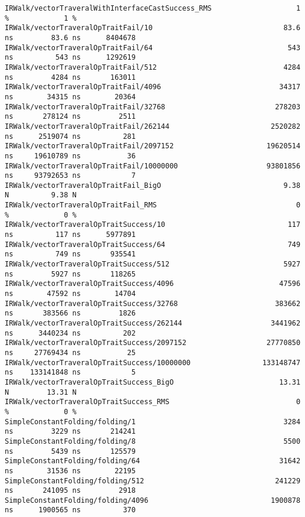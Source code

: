 \begin{code}
\begin{verbatim}
IRWalk/vectorTraveralWithInterfaceCastSuccess_RMS                    1 %             1 %
IRWalk/vectorTraveralOpTraitFail/10                               83.6 ns         83.6 ns      8404678
IRWalk/vectorTraveralOpTraitFail/64                                543 ns          543 ns      1292619
IRWalk/vectorTraveralOpTraitFail/512                              4284 ns         4284 ns       163011
IRWalk/vectorTraveralOpTraitFail/4096                            34317 ns        34315 ns        20364
IRWalk/vectorTraveralOpTraitFail/32768                          278203 ns       278124 ns         2511
IRWalk/vectorTraveralOpTraitFail/262144                        2520282 ns      2519074 ns          281
IRWalk/vectorTraveralOpTraitFail/2097152                      19620514 ns     19610789 ns           36
IRWalk/vectorTraveralOpTraitFail/10000000                     93801856 ns     93792653 ns            7
IRWalk/vectorTraveralOpTraitFail_BigO                             9.38 N          9.38 N
IRWalk/vectorTraveralOpTraitFail_RMS                                 0 %             0 %
IRWalk/vectorTraveralOpTraitSuccess/10                             117 ns          117 ns      5977891
IRWalk/vectorTraveralOpTraitSuccess/64                             749 ns          749 ns       935541
IRWalk/vectorTraveralOpTraitSuccess/512                           5927 ns         5927 ns       118265
IRWalk/vectorTraveralOpTraitSuccess/4096                         47596 ns        47592 ns        14704
IRWalk/vectorTraveralOpTraitSuccess/32768                       383662 ns       383566 ns         1826
IRWalk/vectorTraveralOpTraitSuccess/262144                     3441962 ns      3440234 ns          202
IRWalk/vectorTraveralOpTraitSuccess/2097152                   27770850 ns     27769434 ns           25
IRWalk/vectorTraveralOpTraitSuccess/10000000                 133148747 ns    133141848 ns            5
IRWalk/vectorTraveralOpTraitSuccess_BigO                         13.31 N         13.31 N
IRWalk/vectorTraveralOpTraitSuccess_RMS                              0 %             0 %
SimpleConstantFolding/folding/1                                   3284 ns         3229 ns       214241
SimpleConstantFolding/folding/8                                   5500 ns         5439 ns       125579
SimpleConstantFolding/folding/64                                 31642 ns        31536 ns        22195
SimpleConstantFolding/folding/512                               241229 ns       241095 ns         2918
SimpleConstantFolding/folding/4096                             1900878 ns      1900565 ns          370

\end{verbatim}
\end{code}
